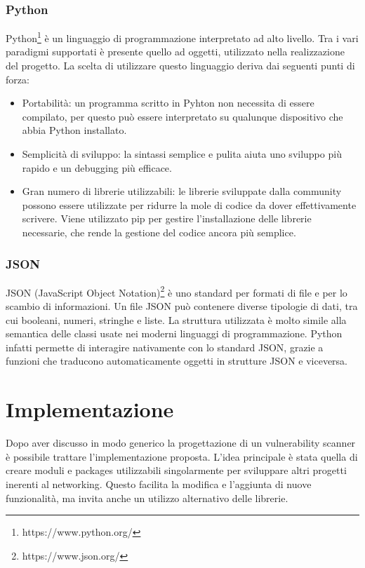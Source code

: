 \documentclass[12pt]{report}
\begin{document}
\subsection{Python}

Python\footnote{https://www.python.org/} è un linguaggio di programmazione interpretato ad alto livello. Tra i vari paradigmi supportati è presente quello ad oggetti, utilizzato nella realizzazione del progetto. La scelta di utilizzare questo linguaggio deriva dai seguenti punti di forza: 
\begin{itemize}
    \item Portabilità: un programma scritto in Pyhton non necessita di essere compilato, per questo può essere interpretato su qualunque dispositivo che abbia Python installato.
    \item Semplicità di sviluppo: la sintassi semplice e pulita aiuta uno sviluppo più rapido e un debugging più efficace.
    \item Gran numero di librerie utilizzabili: le librerie sviluppate dalla community possono essere utilizzate per ridurre la mole di codice da dover effettivamente scrivere. Viene utilizzato pip per gestire l'installazione delle librerie necessarie, che rende la gestione del codice ancora più semplice.
\end{itemize}

\subsection{JSON}

JSON (JavaScript Object Notation)\footnote{https://www.json.org/} è uno standard per formati di file e per lo scambio di informazioni. Un file JSON può contenere diverse tipologie di dati, tra cui booleani, numeri, stringhe e liste. La struttura utilizzata è molto simile alla semantica delle classi usate nei moderni linguaggi di programmazione. Python infatti permette di interagire nativamente con lo standard JSON, grazie a funzioni che traducono automaticamente oggetti in strutture JSON e viceversa.

% 
% 

\chapter{Implementazione}
\label{cap:implementazione}

Dopo aver discusso in modo generico la progettazione di un vulnerability scanner è possibile trattare l'implementazione proposta. L'idea principale è stata quella di creare moduli e packages utilizzabili singolarmente per sviluppare altri progetti inerenti al networking. Questo facilita la modifica e l'aggiunta di nuove funzionalità, ma invita anche un utilizzo alternativo delle librerie.
\end{document}
